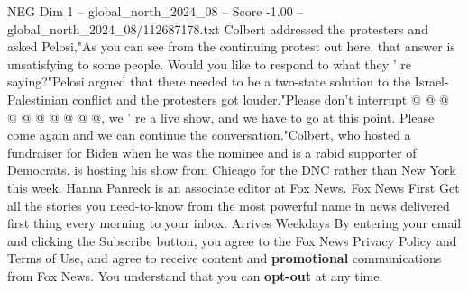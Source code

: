 \begin{textsample}{NEG Dim 1 – global\_north\_2024\_08 – Score -1.00 – global\_north\_2024\_08/112687178.txt}
Colbert addressed the protesters and asked Pelosi,"As you can see from the continuing protest out here, that answer is unsatisfying to some people.
Would you like to respond to what they ' re saying?"Pelosi argued that there needed to be a two-state solution to the Israel-Palestinian conflict and the protesters got louder."Please don't interrupt @ @ @ @ @ @ @ @ @ @, we ' re a live show, and we have to go at this point.
Please come again and we can continue the conversation."Colbert, who hosted a fundraiser for Biden when he was the nominee and is a rabid supporter of Democrats, is hosting his show from Chicago for the DNC rather than New York this week.
Hanna Panreck is an associate editor at Fox News.
Fox News First Get all the stories you need-to-know from the most powerful name in news delivered first thing every morning to your inbox.
Arrives Weekdays By entering your email and clicking the Subscribe button, you agree to the Fox News Privacy Policy and Terms of Use, and agree to receive content and \textbf{promotional} communications from Fox News.
You understand that you can \textbf{opt-out} at any time.

\end{textsample}
